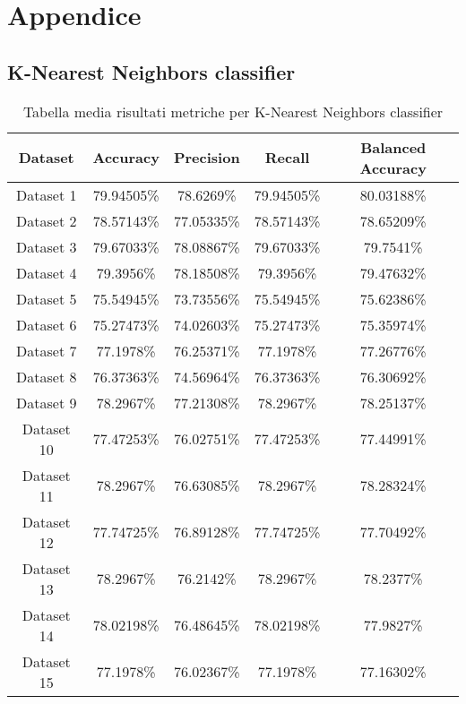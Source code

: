 \chapter{Appendice}
\label{chap:tabelle_risultati_analisi}
\newpage

\section{K-Nearest Neighbors classifier}
\begin{table}
\centering
\caption{Tabella media risultati metriche per K-Nearest Neighbors classifier}
\label{tab:3}
\begin{tabular}{ |c||c|c|c|c| } 
    \hline
    Dataset & Accuracy & Precision & Recall & Balanced Accuracy\\ 
    \hline\hline
    Dataset 1 & 79.94505\% & 78.6269\% & 79.94505\% & 80.03188\%\\
    \hline
    Dataset 2 & 78.57143\% & 77.05335\% & 78.57143\% & 78.65209\%\\
    \hline
    Dataset 3 & 79.67033\% & 78.08867\% & 79.67033\% & 79.7541\%\\
    \hline
    Dataset 4 & 79.3956\% & 78.18508\% & 79.3956\% & 79.47632\%\\
    \hline
    Dataset 5 & 75.54945\% & 73.73556\% & 75.54945\% & 75.62386\%\\
    \hline
    Dataset 6 & 75.27473\% & 74.02603\% & 75.27473\% & 75.35974\%\\
    \hline
    Dataset 7 & 77.1978\% & 76.25371\% & 77.1978\% & 77.26776\%\\
    \hline
    Dataset 8 & 76.37363\% & 74.56964\% & 76.37363\% & 76.30692\%\\
    \hline
    Dataset 9 & 78.2967\% & 77.21308\% & 78.2967\% & 78.25137\%\\
    \hline
    Dataset 10 & 77.47253\% & 76.02751\% & 77.47253\% & 77.44991\%\\
    \hline
    Dataset 11 & 78.2967\% & 76.63085\% & 78.2967\% & 78.28324\%\\
    \hline
    Dataset 12 & 77.74725\% & 76.89128\% & 77.74725\% & 77.70492\%\\
    \hline
    Dataset 13 & 78.2967\% & 76.2142\% & 78.2967\% & 78.2377\%\\
    \hline
    Dataset 14 & 78.02198\% & 76.48645\% & 78.02198\% & 77.9827\%\\
    \hline
    Dataset 15 & 77.1978\% & 76.02367\% & 77.1978\% & 77.16302\%\\
    \hline

\end{tabular}
\end{table}
